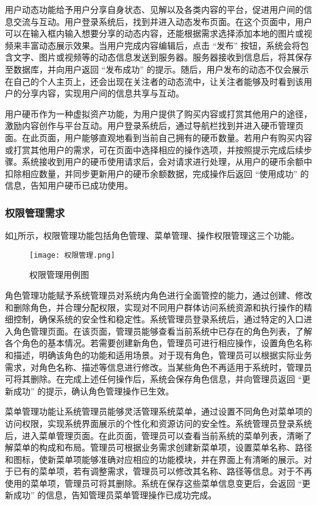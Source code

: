 用户动态功能给予用户分享自身状态、见解以及各类内容的平台，促进用户间的信息交流与互动。用户登录系统后，找到并进入动态发布页面。在这个页面中，用户可以在输入框内输入想要分享的动态内容，还能根据需求选择添加本地的图片或视频来丰富动态展示效果。当用户完成内容编辑后，点击 “发布” 按钮，系统会将包含文字、图片或视频等的动态信息发送到服务器。服务器接收到信息后，将其保存至数据库，并向用户返回 “发布成功” 的提示。随后，用户发布的动态不仅会展示在自己的个人主页上，还会出现在关注者的动态流中，让关注者能够及时看到该用户的分享内容，实现用户间的信息共享与互动。

用户硬币作为一种虚拟资产功能，为用户提供了购买内容或打赏其他用户的途径，激励内容创作与平台互动。用户登录系统后，通过导航栏找到并进入硬币管理页面。在此页面，用户能够直观地看到当前自己拥有的硬币数量。若用户有购买内容或打赏其他用户的需求，可在页面中选择相应的操作选项，并按照提示完成后续步骤。系统接收到用户的硬币使用请求后，会对请求进行处理，从用户的硬币余额中扣除相应数量，并同步更新用户的硬币余额数据，完成操作后返回 “使用成功” 的信息，告知用户硬币已成功使用。

\subsubsection{权限管理需求}

如\ref{权限管理用例图}所示，权限管理功能包括角色管理、菜单管理、操作权限管理这三个功能。
\begin{figure}[hbt]
    \centering
    \texttt{[image: 权限管理.png]}
    \caption{权限管理用例图}
    \label{权限管理用例图}
\end{figure}

角色管理功能赋予系统管理员对系统内角色进行全面管控的能力，通过创建、修改和删除角色，并合理分配权限，实现对不同用户群体访问系统资源和执行操作的精细控制，确保系统的安全性和稳定性。系统管理员登录系统后，通过特定的入口进入角色管理页面。在该页面，管理员能够查看当前系统中已存在的角色列表，了解各个角色的基本情况。若需要创建新角色，管理员可进行相应操作，设置角色名称和描述，明确该角色的功能和适用场景。对于现有角色，管理员可以根据实际业务需求，对角色名称、描述等信息进行修改。当某些角色不再适用于系统时，管理员可将其删除。在完成上述任何操作后，系统会保存角色信息，并向管理员返回 “更新成功” 的提示，确认角色管理操作已生效。

菜单管理功能让系统管理员能够灵活管理系统菜单，通过设置不同角色对菜单项的访问权限，实现系统界面展示的个性化和资源访问的安全性。系统管理员登录系统后，进入菜单管理页面。在此页面，管理员可以查看当前系统的菜单列表，清晰了解菜单的构成和布局。管理员可根据业务需求创建新菜单项，设置菜单名称、路径和图标，使新菜单项能够准确对应相应的功能模块，并在界面上有清晰的展示。对于已有的菜单项，若有调整需求，管理员可以修改其名称、路径等信息。对于不再使用的菜单项，管理员可将其删除。系统在保存这些菜单信息变更后，会返回 “更新成功” 的信息，告知管理员菜单管理操作已成功完成。

